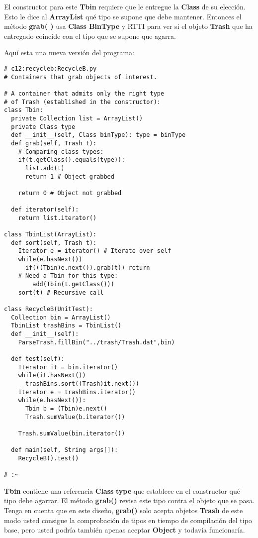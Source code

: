 El constructor para este \textbf{Tbin } requiere que le entregue la \textbf{Class} de su elección. Esto le dice al \textbf{ArrayList} qué tipo se supone que debe mantener. Entonces el método \textbf{grab( )} usa \textbf{Class BinType} y RTTI para ver si el objeto \textbf{Trash} que ha entregado coincide con el tipo que se supone que agarra.      \newline

Aquí esta una nueva versión del programa:       \newline

\begin{lstlisting} 
# c12:recycleb:RecycleB.py 
# Containers that grab objects of interest. 

# A container that admits only the right type 
# of Trash (established in the constructor): 
class Tbin: 
  private Collection list = ArrayList() 
  private Class type 
  def __init__(self, Class binType): type = binType  
  def grab(self, Trash t): 
    # Comparing class types: 
    if(t.getClass().equals(type)): 
      list.add(t) 
      return 1 # Object grabbed 
      
    return 0 # Object not grabbed  
    
  def iterator(self): 
    return list.iterator() 
    
class TbinList(ArrayList): 
  def sort(self, Trash t): 
    Iterator e = iterator() # Iterate over self 
    while(e.hasNext()) 
      if(((Tbin)e.next()).grab(t)) return 
    # Need a Tbin for this type: 
        add(Tbin(t.getClass())) 
    sort(t) # Recursive call 
    
class RecycleB(UnitTest): 
  Collection bin = ArrayList() 
  TbinList trashBins = TbinList() 
  def __init__(self): 
    ParseTrash.fillBin("../trash/Trash.dat",bin) 
    
  def test(self): 
    Iterator it = bin.iterator() 
    while(it.hasNext()) 
      trashBins.sort((Trash)it.next()) 
    Iterator e = trashBins.iterator() 
    while(e.hasNext()): 
      Tbin b = (Tbin)e.next() 
      Trash.sumValue(b.iterator()) 
      
    Trash.sumValue(bin.iterator()) 
    
  def main(self, String args[]): 
    RecycleB().test() 
    
# :~ 
\end{lstlisting}

\textbf{Tbin} contiene una referencia \textbf{Class} \textbf{type} que establece en el constructor qué tipo debe agarrar. El método \textbf{grab()} revisa este tipo contra el objeto que se pasa. Tenga en cuenta que en este diseño, \textbf{grab()} solo acepta objetos \textbf{Trash} de este modo usted consigue la comprobación de tipos en tiempo de compilación del tipo base, pero usted podría también apenas aceptar \textbf{Object} y todavía funcionaría.      \newline

